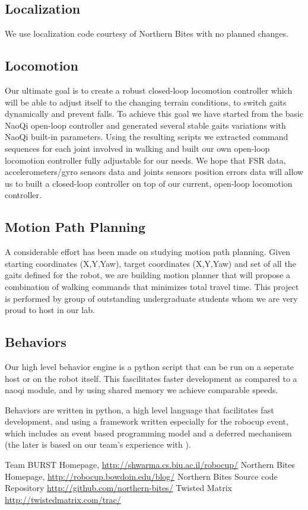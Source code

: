 \documentclass[runningheads,a4paper]{llncs}
\begin{document}
\subsection{Localization}
\label{localization}
We use localization code courtesy of Northern Bites \cite{northern,northern-repo} with no planned changes.

\subsection{Locomotion}
Our ultimate goal is to create a robust closed-loop locomotion controller which will be able to adjust itself to the changing terrain conditions, to switch gaits dynamically and prevent falls. To achieve this goal we have started from the basic NaoQi open-loop controller and generated several stable gaits variations with NaoQi built-in parameters. Using the resulting scripts we extracted command sequences for each joint involved in walking and built our own open-loop locomotion controller fully adjustable for our needs. We hope that FSR data, accelerometers/gyro sensors data and joints sensors position errors data will allow us to built a closed-loop controller on top of our current, open-loop locomotion controller.

\subsection{Motion Path Planning}
A considerable effort has been made on studying motion path planning. Given starting coordinates (X,Y,Yaw), target coordinates (X,Y,Yaw) and set of all the gaits defined for the robot, we are building motion planner that will propose a combination of walking commands that minimizes total travel time. This project is performed by group of outstanding undergraduate students whom we are very proud to host in our lab.

\subsection{Behaviors}
\label{behavior}
Our high level behavior engine is a python script that can be run on a seperate host or on the robot itself. This fascilitates faster development as compared to a naoqi module, and by using shared memory we achieve comparable speeds. 

Behaviors are written in python, a high level language that facilitates fast development, and using a framework written especially for the robocup event, which includes an event based programming model and a deferred mechanisem (the later is based on our team's experience with \cite{twisted}).

\label{references}


\begin{thebibliography}{4}

 Team BURST Homepage, \url{http://shwarma.cs.biu.ac.il/robocup/}
 Northern Bites Homepage,
\url{http://robocup.bowdoin.edu/blog/}
 Northern Bites Source code Repository
\url{http://github.com/northern-bites/}
 Twisted Matrix
\url{http://twistedmatrix.com/trac/}
\end{thebibliography}
\end{document}

